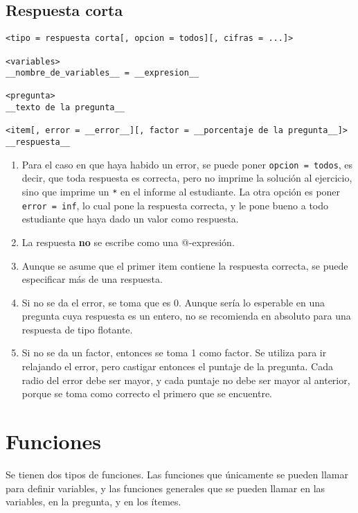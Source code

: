 \documentclass[12pt]{article}
\theoremstyle{definition}
\begin{document}
\subsection{Respuesta corta}

\small
\begin{verbatim}
<tipo = respuesta corta[, opcion = todos][, cifras = ...]>

<variables>
__nombre_de_variables__ = __expresion__

<pregunta>
__texto de la pregunta__

<item[, error = __error__][, factor = __porcentaje de la pregunta__]>
__respuesta__
\end{verbatim}
\normalsize

\begin{enumerate}
  \item Para el caso en que haya habido un error, se puede poner \verb|opcion = todos|, es decir, que toda respuesta es correcta, pero no imprime la solución al ejercicio, sino que imprime un \verb|*| en el informe al estudiante. La otra opción es poner \verb|error = inf|, lo cual pone la respuesta correcta, y le pone bueno a todo estudiante que haya dado un valor como respuesta.
  \item La respuesta \textbf{no} se escribe como una @-expresión.
  \item Aunque se asume que el primer item contiene la respuesta correcta, se puede especificar más de una respuesta.  
  \item Si no se da el error, se toma que es 0. Aunque sería lo esperable en una pregunta cuya respuesta es un entero, no se recomienda en absoluto para una respuesta de tipo flotante. 
  \item Si no se da un factor, entonces se toma 1 como factor. Se utiliza para ir relajando el error, pero castigar entonces el puntaje de la pregunta. Cada radio del error debe ser mayor, y cada puntaje no debe ser mayor al anterior, porque se toma como correcto el primero que se encuentre.
\end{enumerate}

\section{Funciones}

Se tienen dos tipos de funciones. Las funciones que únicamente se pueden llamar para definir variables, y las funciones generales que se pueden llamar en las variables, en la pregunta, y en los ítemes.
\end{document}
